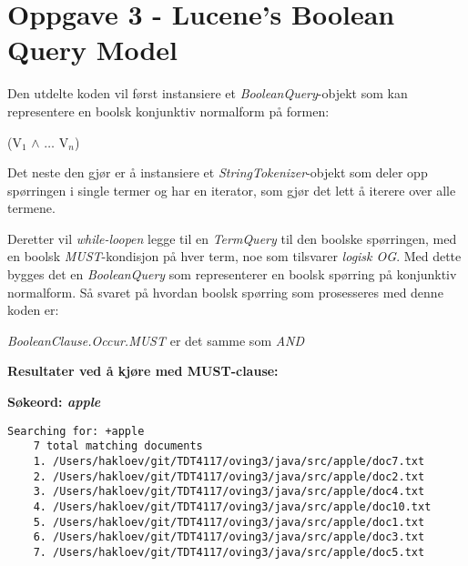 \lstset{language=Java,
numberstyle=\footnotesize,
basicstyle=\ttfamily\footnotesize,
frame=shadowbox,
breaklines=true}

\section*{Oppgave 3 - Lucene's Boolean Query Model}

Den utdelte koden vil først instansiere et \textit{BooleanQuery}-objekt som kan representere en boolsk konjunktiv normalform på formen:

\vspace{2mm}

\begin{center}
(V$_{1}$ $\wedge$ $\dots$ V$_{n}$) \hfill \\
\end{center}

\vspace{2mm}

Det neste den gjør er å instansiere et \textit{StringTokenizer}-objekt som deler opp spørringen i single termer og har en iterator, som gjør det lett å iterere over alle termene.

Deretter vil \textit{while-loopen} legge til en \textit{TermQuery} til den boolske spørringen, med en boolsk \textit{MUST}-kondisjon på hver term, noe som tilsvarer \textit{logisk OG}. Med dette bygges det en \textit{BooleanQuery} som representerer en boolsk spørring på konjunktiv normalform. Så svaret på hvordan boolsk spørring som prosesseres med denne koden er:

\vspace{2mm}

\begin{center}
\textit{BooleanClause.Occur.MUST} er det samme som \textit{AND}
\end{center}

\vspace{5mm}
\noindent \textbf{Resultater ved å kjøre med MUST-clause:} \hfill

\vspace{2mm}
\noindent \textbf{Søkeord: \textit{apple}} \hfill

\begin{lstlisting}[frame=single]
    Searching for: +apple 
    7 total matching documents 
    1. /Users/hakloev/git/TDT4117/oving3/java/src/apple/doc7.txt 
    2. /Users/hakloev/git/TDT4117/oving3/java/src/apple/doc2.txt 
    3. /Users/hakloev/git/TDT4117/oving3/java/src/apple/doc4.txt 
    4. /Users/hakloev/git/TDT4117/oving3/java/src/apple/doc10.txt
    5. /Users/hakloev/git/TDT4117/oving3/java/src/apple/doc1.txt 
    6. /Users/hakloev/git/TDT4117/oving3/java/src/apple/doc3.txt 
    7. /Users/hakloev/git/TDT4117/oving3/java/src/apple/doc5.txt 
\end{lstlisting}

